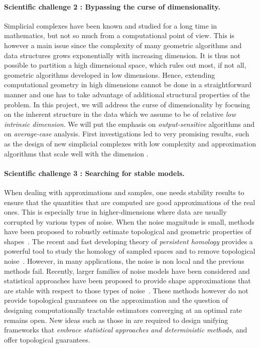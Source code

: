\paragraph{Scientific challenge 2 :  Bypassing the curse of dimensionality.} 
Simplicial complexes have been known and studied for a long time in mathematics, but not so much from a computational point of view. This is however a main issue since the complexity of many geometric algorithms and data structures grows exponentially with increasing dimension. It is thus not possible to partition a high dimensional space, which rules out most, if not all, geometric algorithms developed in low dimensions.
Hence, extending computational geometry in high dimensions cannot be done in a straightforward manner and one has to take advantage of additional structural properties of the problem. %
In this project, we will address the curse of dimensionality by focusing on the inherent structure in the data which we assume to be of relative {\em low intrinsic dimension}.  We will put the emphasis on {\em output-sensitive} algorithms and on {\em average-case} analysis.  First investigations led to very promising results, such as the design of new simplicial complexes with low complexity and approximation algorithms that scale well with the dimension \cite{geometrica-7142i}.
\vspace{-3.1mm}



\paragraph{Scientific challenge 3 : Searching for stable models.} 
When dealing with approximations and samples, one needs stability results to ensure that the quantities that are computed are good approximations of the real ones. This is especially true in higher-dimensions where data are usually corrupted by various types of noise.  When the noise magnitude is small, methods have been proposed to robustly estimate topological and geometric properties of shapes~\cite{nsw-tvu-2011}.  The recent and fast developing theory of {\em persistent homology} provides a powerful tool to study  the homology of sampled spaces and to remove topological noise~\cite{hh-ct-2010}.
However, in  many applications, the noise is non local and the previous methods fail.
Recently,  larger families of noise models  have been considered and statistical approaches  have been proposed to provide shape approximations that are stable with respect to   those types of noise~\cite{gpvw-mme-2011}. These methods however do not provide topological guarantees on the approximation and the question of designing computationally tractable estimators converging at an optimal rate remains open. New ideas such as those in \cite{ccsm-gipm-2011} are required to 
design  unifying frameworks that {\em embrace statistical approaches and deterministic methods}, and offer topological guarantees. 


